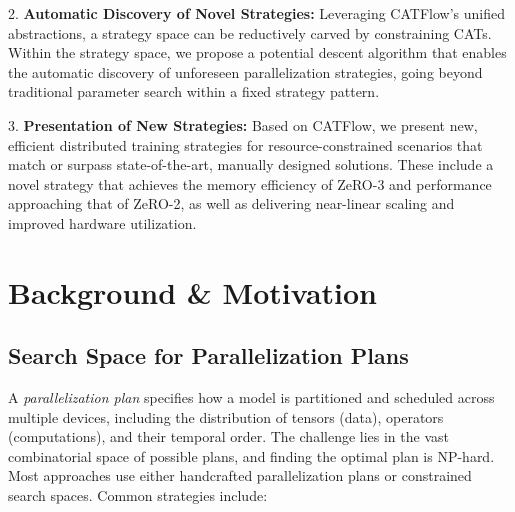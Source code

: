 \documentclass[letterpaper,twocolumn,10pt]{article}
\newcommand{\name}{CATFlow}
\begin{document}
2. \textbf{Automatic Discovery of Novel Strategies:} Leveraging \name{}'s unified abstractions, a strategy space can be reductively carved by constraining CATs. Within the strategy space, we propose a potential descent algorithm that enables the automatic discovery of unforeseen parallelization strategies, going beyond traditional parameter search within a fixed strategy pattern.

3. \textbf{Presentation of New Strategies:} Based on \name{}, we present new, efficient distributed training strategies for resource-constrained scenarios that match or surpass state-of-the-art, manually designed solutions. These include a novel strategy that achieves the memory efficiency of ZeRO-3 and performance approaching that of ZeRO-2, as well as delivering near-linear scaling and improved hardware utilization.

\section{Background \& Motivation}

\subsection{Search Space for Parallelization Plans}


A \textit{parallelization plan} specifies how a model is partitioned and scheduled across multiple devices, including the distribution of tensors (data), operators (computations), and their temporal order. The challenge lies in the vast combinatorial space of possible plans, and finding the optimal plan is NP-hard. Most approaches use either handcrafted parallelization plans or constrained search spaces. Common strategies include:
\end{document}
